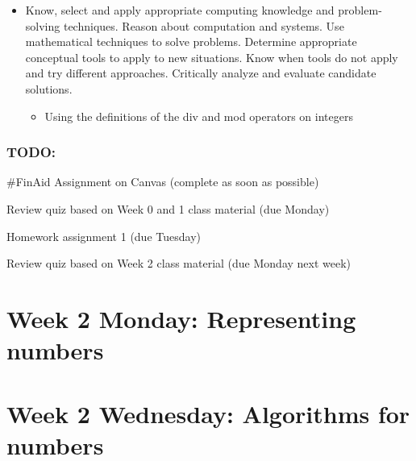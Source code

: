 \begin{itemize}
\item Know, select and apply appropriate computing knowledge and problem-solving techniques. Reason about computation and systems. Use mathematical techniques to solve problems. Determine appropriate conceptual tools to apply to new situations. Know when tools do not apply and try different approaches. Critically analyze and evaluate candidate solutions.
\begin{itemize}
    \item Using the definitions of the div and mod operators on integers
\end{itemize}

\end{itemize}

\subsubsection*{TODO:}
\begin{list}
   {\itemsep2pt}
   \item \#FinAid Assignment on Canvas (complete as soon as possible) 
   \item Review quiz based on Week 0 and 1 class material (due Monday)
   \item Homework assignment 1 (due Tuesday)
   \item Review quiz based on Week 2 class material (due Monday next week)
\end{list}

\newpage




\section*{Week 2 Monday: Representing numbers}


\vfill
\newpage



\vfill
\newpage

\vfill


\newpage
\section*{Week 2 Wednesday: Algorithms for numbers}




%

